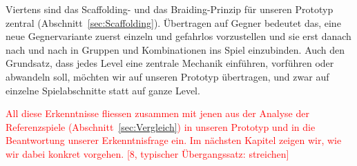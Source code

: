 \documentclass[../Main.tex]{subfiles}
\begin{document}
Viertens sind das Scaffolding- und das Braiding-Prinzip für unseren Prototyp zentral (Abschnitt~\ref{sec:Scaffolding}). Übertragen auf Gegner bedeutet das, eine neue Gegnervariante zuerst einzeln und gefahrlos vorzustellen und sie erst danach nach und nach in Gruppen und Kombinationen ins Spiel einzubinden. Auch den Grundsatz, dass jedes Level eine zentrale Mechanik einführen, vorführen oder abwandeln soll, möchten wir auf unseren Prototyp übertragen, und zwar auf einzelne Spielabschnitte statt auf ganze Level.

\textcolor{red}{All diese Erkenntnisse fliessen zusammen mit jenen aus der Analyse der Referenzspiele (Abschnitt~\ref{sec:Vergleich}) in unseren Prototyp und in die Beantwortung unserer Erkenntnisfrage ein. Im nächsten Kapitel zeigen wir, wie wir dabei konkret vorgehen. [8, typischer Übergangssatz: streichen]}
\end{document}
